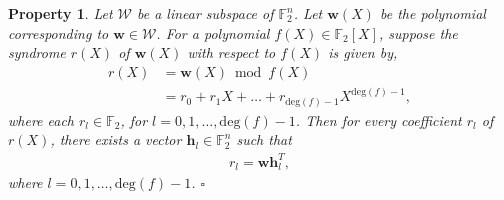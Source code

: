 \documentclass[10pt,journal]{IEEEtran}
\newtheorem{property}{Property}
\def \deg{{\mathrm{deg}}}
\begin{document}
\begin{property}
\label{Property_division1}
%  
Let $\mathcal{W}$ be a linear subspace of $\mathbb{F}_2^n$.
Let $\mathbf{w}(X)$ be the polynomial corresponding to $\mathbf{w} \in \mathcal{W}$.
For a polynomial $f(X) \in \mathbb{F}_2[X]$, suppose the syndrome $r(X)$ of $\mathbf{w}(X)$ with respect to $f(X)$ is given by,
% 
\begin{equation}
% 
\begin{aligned}
%  
r(X) &= \mathbf{w}(X) \bmod f(X) \\
&= r_0 + r_1X + \ldots + r_{\deg(f)-1}X^{\deg(f)-1},
% 
\end{aligned}
% 
\end{equation}
% 
where each $r_l \in \mathbb{F}_2$, for $l = 0,1,\ldots,\deg(f)-1$.
Then for every coefficient $r_l$ of $r(X)$, there exists a vector $\mathbf{h}_l \in \mathbb{F}_2^n$ such that
% 
\begin{align*}
%  
r_l = \mathbf{w} \mathbf{h}_l^T,
\label{Eqn_r_l_w_h_perp}
% 
\end{align*}
% 
where $l = 0,1,\ldots,\deg(f)-1$.
\hfill $\square$
% 
\end{property}
% 
% 
\end{document}
